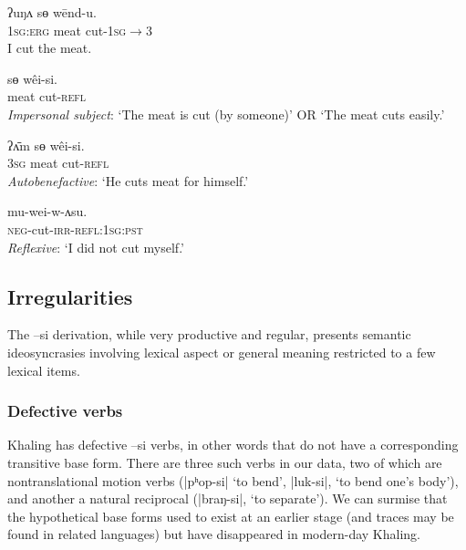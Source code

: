 \documentclass[twoside,a4paper,11pt]{article}
\newcommand{\ipa}[1]{{\phon#1}}
\begin{document}
\begin{exe}
\ex \label{ex:wendu} 
\gll 
\ipa{ʔuŋʌ}  	\ipa{sɵ}  	\ipa{wēnd-u.}  \\
\textsc{1sg:erg} meat cut-\textsc{1sg$\rightarrow$3} \\
\glt I cut the meat.
\end{exe}

\begin{exe}
\ex \label{ex:weisi} 
\gll 
 \ipa{sɵ}  	\ipa{wêi-si.}  \\
 meat cut-\textsc{refl} \\
\glt \textit{Impersonal subject}: `The meat is cut (by someone)' OR `The meat cuts easily.'
\end{exe}


\begin{exe}
\ex \label{ex:weisi2} 
\gll 
 \ipa{ʔʌ̄m} \ipa{sɵ}  	\ipa{wêi-si.}  \\
\textsc{3sg} meat cut-\textsc{refl} \\
\glt \textit{Autobenefactive}: `He cuts meat for himself.'
\end{exe}
 
\begin{exe}
\ex \label{ex:weiwasu} 
\gll 
	\ipa{mu-wei-w-ʌsu.}  \\
\textsc{neg}-cut-\textsc{irr}-\textsc{refl:1sg:pst} \\
\glt \textit{Reflexive}: `I did not cut myself.'
\end{exe}  

 \subsection{Irregularities}
The  \ipa{--si} derivation, while very productive and regular, presents semantic ideosyncrasies involving lexical aspect or general meaning restricted to a few lexical items.
  
\subsubsection{Defective verbs}
Khaling has defective \ipa{--si} verbs, in other words that do not have a corresponding transitive base form. There are three such verbs in our data, two of which are nontranslational motion verbs  (|\ipa{pʰop-si}| `to bend', |\ipa{luk-si}|, `to bend one’s body’), and another a natural reciprocal (|\ipa{braŋ-si}|, `to separate’). We can surmise that the hypothetical base forms used to exist at an earlier stage (and traces may be found in related languages) but have disappeared in modern-day Khaling.
\end{document}
